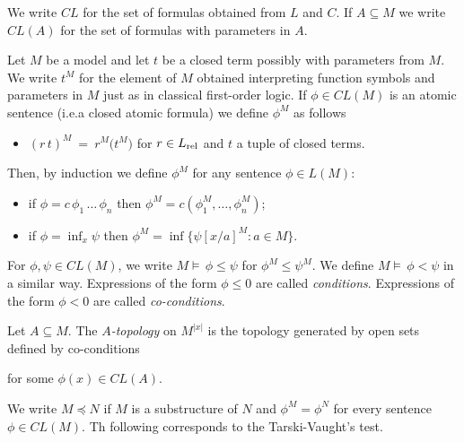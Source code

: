 \documentclass[creche.tex]{subfiles}
\begin{document}
We write $CL$ for the set of formulas obtained from $L$ and $C$. If $A\subseteq M$ we write $CL(A)$ for the set of formulas with parameters in $A$.

Let $M$ be a model and let $t$ be a closed term possibly with parameters from $M$. We write $t^M$ for the element of $M$ obtained interpreting function symbols and parameters in $M$ just as in classical first-order logic. If $\phi\in CL(M)$ is an atomic sentence (i.e.\@ a closed atomic formula) we define $\phi^M$ as follows

\begin{itemize}
\item[1.] $(r\,t)^M\ =\  r^M\big(t^M\big)$ for $r\in L_{\rm rel}$ and $t$ a tuple of closed terms.
\end{itemize}

Then, by induction we define $\phi^M$ for any sentence $\phi\in L(M)$:

\begin{itemize}
\item[1.] if $\phi=c\,\phi_1\,\dots\,\phi_n$ then $\phi^M=c(\phi^M_1,\dots,\phi^M_n)$;
\item[2.] if $\phi=\inf_x\psi$ then $\phi^M=\inf\{\psi[x/a]^M: a\in M\}$.
\end{itemize}


For $\phi, \psi\in CL(M)$, we write \emph{$M\models\,\phi{\le}\psi$\/} for $\phi^M{\le}\psi^M$. We define \emph{$M\models\, \phi{<}\psi$\/} in a similar way. Expressions of the form $\phi\le 0$ are called \emph{conditions}. Expressions of the form $\phi<0$ are called \emph{co-conditions}.

Let $A\subseteq M$. The \emph{$A$-topology\/} on $M^{|x|}$ is the topology generated by open sets defined by co-conditions



for some $\phi(x)\in CL(A)$.

We write \emph{$M\preceq N$\/} if $M$ is a substructure of $N$ and $\phi^M =\phi^N$ for every sentence $\phi\in CL(M)$. Th following corresponds to the Tarski-Vaught's test.
\end{document}
